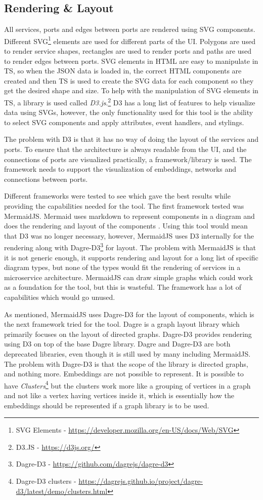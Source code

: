 \subsection{Rendering \& Layout}
All services, ports and edges between ports are rendered using SVG components.
Different SVG\footnote{SVG Elements - \url{https://developer.mozilla.org/en-US/docs/Web/SVG}} elements are used for different parts of the UI. Polygons are used to render service shapes, rectangles are used to render ports and paths are used to render edges between ports.
SVG elements in HTML are easy to manipulate in TS, so when the JSON data is loaded in, the correct HTML components are created and then TS is used to create the SVG data for each component so they get the desired shape and size.
To help with the manipulation of SVG elements in TS, a library is used called \emph{D3.js}.\footnote{D3.JS - \url{https://d3js.org/}} D3 has a long list of features to help visualize data using SVGs, however, the only functionality used for this tool is
the ability to select SVG components and apply attributes, event handlers, and stylings.

The problem with D3 is that it has no way of doing the layout of the services and ports.
To ensure that the architecture is always readable from the UI, and the connections of ports are visualized practically, a framework/library is used.
The framework needs to support the visualization of embeddings, networks and connections between ports.

Different frameworks were tested to see which gave the best results while providing the capabilities needed for the tool.
The first framework tested was MermaidJS. Mermaid uses markdown to represent components in a diagram and does the rendering and layout of the components \cite{mermaid}. Using this tool would mean that D3 was no longer necessary, however, MermaidJS uses D3 internally for the rendering along with Dagre-D3\footnote{Dagre-D3 - \url{https://github.com/dagrejs/dagre-d3}} for layout.
The problem with MermaidJS is that it is not generic enough, it supports rendering and layout for a long list of specific diagram types, but none of the types would fit the rendering of services in a microservice architecture.
MermaidJS can draw simple graphs which could work as a foundation for the tool, but this is wasteful. The framework has a lot of capabilities which would go unused.

As mentioned, MermaidJS uses Dagre-D3 for the layout of components, which is the next framework tried for the tool.
Dagre is a graph layout library which primarily focuses on the layout of directed graphs. Dagre-D3 provides rendering using D3 on top of the base Dagre library.
Dagre and Dagre-D3 are both deprecated libraries, even though it is still used by many including MermaidJS.
The problem with Dagre-D3 is that the scope of the library is directed graphs, and nothing more.
Embeddings are not possible to represent.
It is possible to have \emph{Clusters}\footnote{Dagre-D3 clusters - \url{https://dagrejs.github.io/project/dagre-d3/latest/demo/clusters.html}}
but the clusters work more like a grouping of vertices in a graph and not like a vertex having vertices inside it, which is essentially how the embeddings should be represented if a graph library is to be used.

